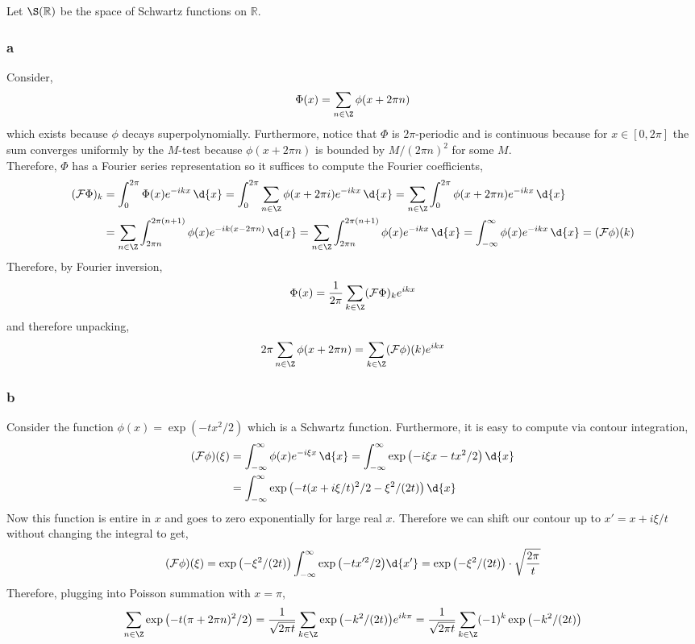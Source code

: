 \documentclass[12pt]{article}
\newcommand{\R}{\mathbb{R}}
\renewcommand{\F}{\mathcal{F}}
\begin{document}
Let $\S(\R)$ be the space of Schwartz functions on $\R$. 

\subsubsection{a}

Consider,
\[ \Phi(x) = \sum_{n \in \Z} \phi(x + 2 \pi n) \]
which exists because $\phi$ decays superpolynomially. Furthermore, notice that $\Phi$ is $2 \pi$-periodic and is continuous because for $x \in [0, 2\pi]$ the sum converges uniformly by the $M$-test because $\phi(x + 2 \pi n)$ is bounded by $M/(2 \pi n)^2$ for some $M$.
\bigskip\\
Therefore, $\Phi$ has a Fourier series representation so it suffices to compute the Fourier coefficients,
\begin{align*}
(\F \Phi)_k & = \int_0^{2 \pi} \Phi(x) e^{- i k x} \, \d{x} = \int_0^{2 \pi} \sum_{n \in \Z} \phi(x + 2 \pi i) e^{-i k x} \, \d{x} = \sum_{n \in \Z} \int_0^{2\pi} \phi(x + 2 \pi n) e^{- i k x} \, \d{x}
\\
& = \sum_{n \in \Z} \int_{2 \pi n}^{2 \pi (n+1)} \phi(x) e^{- i k (x - 2 \pi n)} \, \d{x} = \sum_{n \in \Z} \int_{2 \pi n}^{2 \pi (n+1)} \phi(x) e^{- i k x} \, \d{x} = \int_{-\infty}^\infty \phi(x) e^{- i k x} \, \d{x} = (\F \phi)(k)
\end{align*}
Therefore, by Fourier inversion,
\[ \Phi(x) = \frac{1}{2 \pi} \sum_{k \in \Z} (\F \Phi)_k e^{i k x} \]
and therefore unpacking,
\[ 2 \pi \sum_{n \in \Z} \phi(x + 2 \pi n) = \sum_{k \in \Z} (\F \phi)(k) e^{i k x} \]

\subsubsection{b}

Consider the function $\phi(x) = \exp{\left( - t x^2 / 2 \right)}$ which is a Schwartz function. Furthermore, it is easy to compute via contour integration,
\begin{align*}
(\F \phi)(\xi) & = \int_{-\infty}^{\infty} \phi(x) e^{- i \xi x} \, \d{x} = \int_{-\infty}^\infty \exp{\left( - i \xi x - t x^2 / 2 \right) } \, \d{x} 
\\
& = \int_{-\infty}^\infty \exp{\left( - t (x + i \xi / t)^2 / 2 - \xi^2 / (2 t) \right) } \, \d{x} 
\end{align*}
Now this function is entire in $x$ and goes to zero exponentially for large real $x$. Therefore we can shift our contour up to $x' = x + i \xi / t$ without changing the integral  to get,
\[ (\F \phi)(\xi) = \exp{\left( - \xi^2 /(2 t) \right)} \int_{- \infty}^{\infty} \exp{\left( - t x'^2 / 2 \right)} \d{x'} = \exp{\left( - \xi^2 /(2 t) \right)} \cdot \sqrt{\frac{2 \pi}{t}} \]
Therefore, plugging into Poisson summation with $x = \pi$,
\[ \sum_{n \in \Z} \exp{ \left( - t (\pi + 2 \pi n)^2 / 2 \right)} = \frac{1}{\sqrt{2 \pi t}} \sum_{k \in \Z} \exp{ \left( - k^2 / (2 t) \right)} e^{i k \pi} = \frac{1}{\sqrt{2 \pi t}} \sum_{k \in \Z} (-1)^k \exp{ \left( - k^2 / (2 t) \right)} \]
\end{document}

